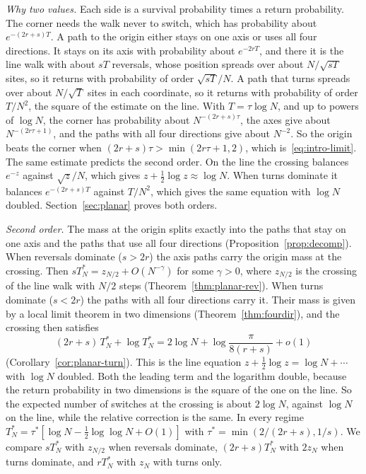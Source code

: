 \emph{Why two values.} Each side is a survival probability times a return
probability. The corner needs the walk never to switch, which has probability
about $e^{-(2r+s)T}$. A path to the origin either stays on one axis or uses all
four directions. It stays on its axis with probability about $e^{-2rT}$, and
there it is the line walk with about $sT$ reversals, whose position spreads
over about $N/\sqrt{sT}$ sites, so it returns with probability of order
$\sqrt{sT}/N$. A path that turns spreads over about $N/\sqrt T$ sites in each
coordinate, so it returns with probability of order $T/N^2$, the square of the
estimate on the line. With $T=\tau\log N$, and up to powers of $\log N$, the
corner has probability about $N^{-(2r+s)\tau}$, the axes give about
$N^{-(2r\tau+1)}$, and the paths with all four directions give about $N^{-2}$.
So the origin beats the corner when $(2r+s)\tau>\min(2r\tau+1,2)$, which
is~\eqref{eq:intro-limit}. The same estimate predicts the second order. On the
line the crossing balances $e^{-z}$ against $\sqrt z/N$, which gives
$z+\frac12\log z\approx\log N$. When turns dominate it balances
$e^{-(2r+s)T}$ against $T/N^2$, which gives the same equation with $\log N$
doubled. Section~\ref{sec:planar} proves both orders.

\emph{Second order.} The mass at
the origin splits exactly into the paths that stay on one axis and the paths
that use all four directions (Proposition~\ref{prop:decomp}). When reversals
dominate ($s>2r$) the axis paths carry the origin mass at the crossing. Then
$sT^*_N=z_{N/2}+O(N^{-\gamma})$ for some $\gamma>0$, where $z_{N/2}$ is the
crossing of the line walk with $N/2$ steps (Theorem~\ref{thm:planar-rev}).
When turns dominate ($s<2r$) the paths with all four directions carry it.
Their mass is given by a local limit theorem in two dimensions
(Theorem~\ref{thm:fourdir}), and the crossing then satisfies
\[
 (2r+s)\,T^*_N+\log T^*_N=2\log N+\log\frac\pi{8(r+s)}+o(1)
\]
(Corollary~\ref{cor:planar-turn}). This is the line equation
$z+\frac12\log z=\log N+\cdots$ with $\log N$ doubled. Both the leading term
and the logarithm double, because the return probability in two dimensions is
the square of the one on the line. So the expected number of switches at the
crossing is about $2\log N$, against $\log N$ on the line, while the relative
correction is the same. In every regime
$T^*_N=\tau^*[\log N-\frac12\log\log N+O(1)]$ with
$\tau^*=\min(2/(2r+s),1/s)$. We compare $sT^*_N$ with $z_{N/2}$ when reversals
dominate, $(2r+s)T^*_N$ with $2z_N$ when turns dominate, and $rT^*_N$ with $z_N$
with turns only.

